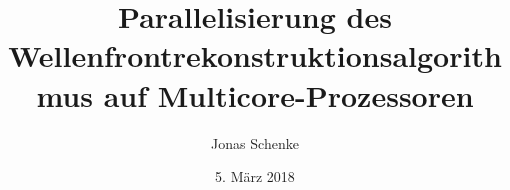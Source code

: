 \documentclass[bachinf,zihtitle,german,final,hyperref,utf8]{res/zihpub}
\author{Jonas Schenke}
\title{Parallelisierung des Wellenfrontrekonstruktionsalgorithmus auf Multicore-Prozessoren}
\date{5. März 2018}
\begin{document}
	\printglossaries
	
	
	
	
	
	
	\appendix
	\printbibliography
\end{document}
